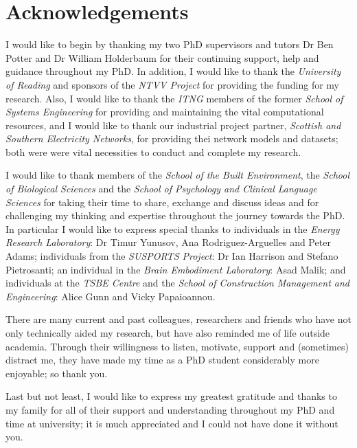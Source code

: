 \chapter*{Acknowledgements}

I would like to begin by thanking my two PhD supervisors and tutors Dr Ben Potter and Dr William Holderbaum for their continuing support, help and guidance throughout my PhD.
In addition, I would like to thank the \textit{University of Reading} and sponsors of the \textit{NTVV Project} for providing the funding for my research.
Also, I would like to thank the \textit{ITNG} members of the former \textit{School of Systems Engineering} for providing and maintaining the vital computational resources, and I would like to thank our industrial project partner, \textit{Scottish and Southern Electricity Networks}, for providing thei network models and datasets; both were were vital necessities to conduct and complete my research.

I would like to thank members of the \textit{School of the Built Environment}, the \textit{School of Biological Sciences} and the \textit{School of Psychology and Clinical Language Sciences} for taking their time to share, exchange and discuss ideas and for challenging my thinking and expertise throughout the journey towards the PhD.
In particular I would like to express special thanks to individuals in the \textit{Energy Research Laboratory}: Dr Timur Yunusov, Ana Rodriguez-Arguelles and Peter Adams; individuals from the \textit{SUSPORTS Project}: Dr Ian Harrison and Stefano Pietrosanti; an individual in the \textit{Brain Embodiment Laboratory}: Asad Malik; and individuals at the \textit{TSBE Centre} and the \textit{School of Construction Management and Engineering}: Alice Gunn and Vicky Papaioannou.

There are many current and past colleagues, researchers and friends who have not only technically aided my research, but have also reminded me of life outside academia.
Through their willingness to listen, motivate, support and (sometimes) distract me, they have made my time as a PhD student considerably more enjoyable; so thank you.


Last but not least, I would like to express my greatest gratitude and thanks to my family for all of their support and understanding throughout my PhD and time at university; it is much appreciated and I could not have done it without you.